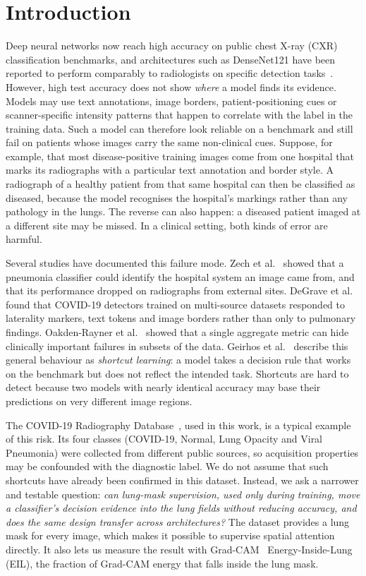 \section{Introduction}

Deep neural networks now reach high accuracy on public chest X-ray (CXR) classification benchmarks, and architectures such as DenseNet121 have been reported to perform comparably to radiologists on specific detection tasks~\cite{rajpurkar2017chexnet}. However, high test accuracy does not show \emph{where} a model finds its evidence. Models may use text annotations, image borders, patient-positioning cues or scanner-specific intensity patterns that happen to correlate with the label in the training data. Such a model can therefore look reliable on a benchmark and still fail on patients whose images carry the same non-clinical cues. Suppose, for example, that most disease-positive training images come from one hospital that marks its radiographs with a particular text annotation and border style. A radiograph of a healthy patient from that same hospital can then be classified as diseased, because the model recognises the hospital's markings rather than any pathology in the lungs. The reverse can also happen: a diseased patient imaged at a different site may be missed. In a clinical setting, both kinds of error are harmful.

Several studies have documented this failure mode. Zech et al.~\cite{zech2018variable} showed that a pneumonia classifier could identify the hospital system an image came from, and that its performance dropped on radiographs from external sites. DeGrave et al.~\cite{degrave2021shortcuts} found that COVID-19 detectors trained on multi-source datasets responded to laterality markers, text tokens and image borders rather than only to pulmonary findings. Oakden-Rayner et al.~\cite{oakdenrayner2020hidden} showed that a single aggregate metric can hide clinically important failures in subsets of the data. Geirhos et al.~\cite{geirhos2020shortcut} describe this general behaviour as \emph{shortcut learning}: a model takes a decision rule that works on the benchmark but does not reflect the intended task. Shortcuts are hard to detect because two models with nearly identical accuracy may base their predictions on very different image regions.

The COVID-19 Radiography Database~\cite{chowdhury2020covidradiography,rahman2021enhancement}, used in this work, is a typical example of this risk. Its four classes (COVID-19, Normal, Lung Opacity and Viral Pneumonia) were collected from different public sources, so acquisition properties may be confounded with the diagnostic label. We do not assume that such shortcuts have already been confirmed in this dataset. Instead, we ask a narrower and testable question: \emph{can lung-mask supervision, used only during training, move a classifier's decision evidence into the lung fields without reducing accuracy, and does the same design transfer across architectures?} The dataset provides a lung mask for every image, which makes it possible to supervise spatial attention directly. It also lets us measure the result with Grad-CAM~\cite{selvaraju2017gradcam} Energy-Inside-Lung (EIL), the fraction of Grad-CAM energy that falls inside the lung mask.

